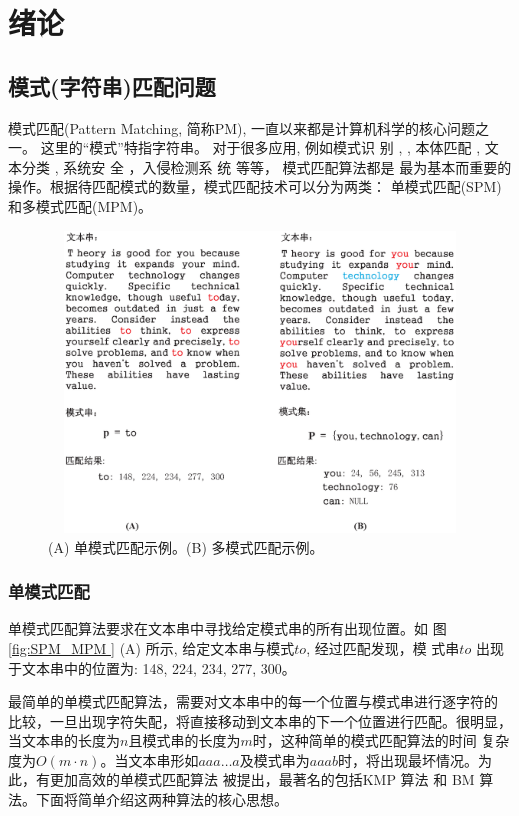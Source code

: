 \chapter{绪论}

\section{模式(字符串)匹配问题}

模式匹配(Pattern Matching, 简称PM), 一直以来都是计算机科学的核心问题之
一。 这里的“模式”特指字符串。 对于很多应用, 例如模式识
别 \cite{Yan2016}, \cite{Xiao2016}, 本体匹配 \cite{Xue2015}
\cite{Xue2016}, 文本分类 \cite{Tang2015} \cite{Zhang2016}, 系统安
全 \cite{Dien2014,Malhotra2016,Fan2016}，入侵检测系
统 \cite{Kim2015,Arney2016,Sadotra2016,Lee2017} 等等， 模式匹配算法都是
最为基本而重要的操作。根据待匹配模式的数量，模式匹配技术可以分为两类：
单模式匹配(SPM)和多模式匹配(MPM)。

\begin{figure}[!h]
  \centering
  \includegraphics[height=8cm ,width=12cm]{figures/1_Introduction/SPM_MPM.eps}
  \caption{(A) 单模式匹配示例。(B) 多模式匹配示例。}
  \label{fig:SPM_MPM}
\end{figure}


\subsection{单模式匹配}

单模式匹配算法要求在文本串中寻找给定模式串的所有出现位置。如
图 \ref{fig:SPM_MPM } (A) 所示, 给定文本串与模式$to$, 经过匹配发现，模
式串$to$ 出现于文本串中的位置为: 148, 224, 234, 277, 300。

最简单的单模式匹配算法，需要对文本串中的每一个位置与模式串进行逐字符的
比较，一旦出现字符失配，将直接移动到文本串的下一个位置进行匹配。很明显，
当文本串的长度为$n$且模式串的长度为$m$时，这种简单的模式匹配算法的时间
复杂度为$O(m \cdot
n)$。当文本串形如$aaa \dots
a$及模式串为$aaab$时，将出现最坏情况。为此，有更加高效的单模式匹配算法
被提出，最著名的包括KMP \cite{Knuth1977}算法 和 BM \cite{Boyer1977} 算
法。下面将简单介绍这两种算法的核心思想。

